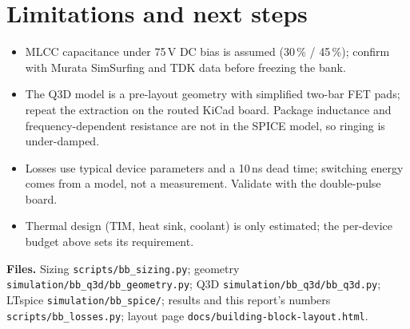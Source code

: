 ﻿\documentclass[10pt,a4paper]{article}
\begin{document}
\section{Limitations and next steps}
\begin{itemize}\itemsep0pt
\item MLCC capacitance under 75\,V DC bias is assumed (30\,\% / 45\,\%); confirm with Murata SimSurfing and TDK data before freezing the bank.
\item The Q3D model is a pre-layout geometry with simplified two-bar FET pads; repeat the extraction on the routed KiCad board. Package inductance and frequency-dependent resistance are not in the SPICE model, so ringing is under-damped.
\item Losses use typical device parameters and a 10\,ns dead time; switching energy comes from a model, not a measurement. Validate with the double-pulse board.
\item Thermal design (TIM, heat sink, coolant) is only estimated; the per-device budget above sets its requirement.
\end{itemize}

\textbf{Files.} Sizing \texttt{scripts/bb\_sizing.py}; geometry \texttt{simulation/bb\_q3d/bb\_geometry.py}; Q3D \texttt{simulation/bb\_q3d/bb\_q3d.py}; LTspice \texttt{simulation/bb\_spice/}; results and this report's numbers \texttt{scripts/bb\_losses.py}; layout page \texttt{docs/building-block-layout.html}.
\end{document}

